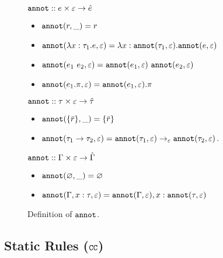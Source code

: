 \begin{figure}
\vspace{-0.2cm}

$\mathtt{annot} :: e \times \varepsilon \rightarrow \hat e$
\vspace{-0.2cm}
\begin{itemize}
	\setlength\itemsep{-0.2em}
	\item[] $\mathtt{annot}(r, \_) = r$
	\item[] $\mathtt{annot}(\lambda x: \tau_1 . e, \varepsilon) = \lambda x: \mathtt{annot}(\tau_1, \varepsilon) . \mathtt{annot}(e, \varepsilon)$
	\item[] $\mathtt{annot}(e_1~e_2, \varepsilon) = \mathtt{annot}(e_1, \varepsilon)~\mathtt{annot}(e_2, \varepsilon)$
	\item[] $\mathtt{annot}(e_1.\pi, \varepsilon) = \mathtt{annot}(e_1, \varepsilon).\pi$
\end{itemize}
	
$\mathtt{annot} :: \tau \times \varepsilon \rightarrow \hat \tau$
\vspace{-0.2cm}

\begin{itemize}
	\setlength\itemsep{-0.2em}
	\item[] $\mathtt{annot}(\{ \bar r \}, \_) = \{ \bar r \}$
	\item[] $\mathtt{annot}(\tau_1 \rightarrow \tau_2, \varepsilon) = \mathtt{annot}(\tau_1, \varepsilon) \rightarrow_{\varepsilon} \mathtt{annot}(\tau_2, \varepsilon)$.	
\end{itemize}

$\mathtt{annot} :: \Gamma \times \varepsilon \rightarrow \hat \Gamma$
\vspace{-0.2cm}

\begin{itemize}
	\setlength\itemsep{-0.2em}
	\item[] $\mathtt{annot}(\varnothing, \_) = \varnothing$
	\item[] $\mathtt{annot}(\Gamma, x: \tau, \varepsilon) = \mathtt{annot}(\Gamma, \varepsilon), x: \mathtt{annot}(\tau, \varepsilon)$
\end{itemize}
\vspace{-0.5cm}
\caption{Definition of $\mathtt{annot}$.}
\vspace{-0.5cm}
\label{fig:annot_defn}
\end{figure}

\vspace{-0.5cm}

\subsection{Static Rules ($\mathtt{CC}$)}

